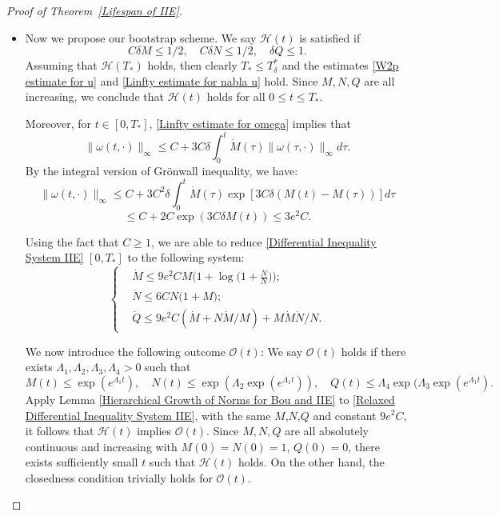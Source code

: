 \documentclass[10pt,a4paper]{amsart}
\begin{document}
\begin{proof}[Proof of Theorem~\ref{Lifespan of IIE}]
\begin{itemize}
\item [(II)]

Now we propose our bootstrap scheme. We say $\mathscr H(t)$ is satisfied if
\begin{equation}\label{Hypothesis IIE}
 C\delta M\le 1/2,\quad C\delta N\le 1/2  ,\quad \delta Q\le 1.
\end{equation}
Assuming that $\mathscr H(T_*)$ holds, then clearly $T_*\le T_\delta^*$ and the estimates \eqref{W2p estimate for u} and \eqref{Linfty estimate for nabla u} hold. Since $M,N,Q$ are all increasing, we conclude that $\mathscr H(t)$ holds for all $0\le t\le T_*$. 

Moreover, for $t\in [0,T_*]$, \eqref{Linfty estimate for omega} implies that
\begin{equation*}
\lVert\omega(t,\cdot)\rVert_\infty\le   C+3C\delta \int_0^t {\dot M(\tau)\lVert\omega(\tau,\cdot)\rVert_\infty} d\tau.  
\end{equation*}
By the integral version of Gr\"onwall inequality, we have:
\begin{equation*}
 \lVert\omega(t,\cdot)\rVert_\infty\le  C+3C^2\delta\int_0^t \dot M(\tau)\exp[3C\delta(M(t)-M(\tau))]d\tau
\end{equation*}
\begin{equation*}
 \le C+2C\exp(3C\delta M(t))\le 3e^2 C .   
\end{equation*}

Using the fact that $C\ge 1$, we are able to reduce \eqref{Differential Inequality System IIE} $[0,T_*]$ to the following system:
\begin{equation}\label{Relaxed Differential Inequality System IIE}
\left\{
\begin{aligned}
&{\dot M}\le  9e^2CM\Big(1+\log\Big(1+\frac{\dot N}{N}\Big)\Big);\\
&\dot N\le 6CN\big(1+M);  \\
&\dot Q\le 9e^2C(\dot M+N\dot M/M)+M\dot M\dot N/N.
\end{aligned}
\right.    
\end{equation}

We now introduce the following outcome $\mathscr O(t)$: We say $\mathscr O(t)$ holds if 
 there exists $\Lambda_1,\Lambda_2,\Lambda_3,\Lambda_4>0$ such that 
\begin{equation*}
M(t)\le \exp(e^{\Lambda_1 t}),\quad N(t)\le \exp(\Lambda_2\exp(e^{\Lambda_1t})),\quad Q(t)\le \Lambda_4\exp(\Lambda_3\exp(e^{\Lambda_1 t}).
\end{equation*}
Apply Lemma \ref{Hierarchical Growth of Norms for Bou and IIE} to \eqref{Relaxed Differential Inequality System IIE}, with the same $M$,$N$,$Q$ and constant $9e^2C$, it follows that $\mathscr H(t)$ implies $\mathscr O(t)$. Since $M,N,Q$ are all absolutely continuous and increasing with $M(0)=N(0)=1$, $Q(0)=0$, there exists sufficiently small $t$ such that $\mathscr H(t)$ holds. On the other hand, the closedness condition trivially holds for $\mathscr O(t)$.


\end{itemize}
\end{proof}
\end{document}
